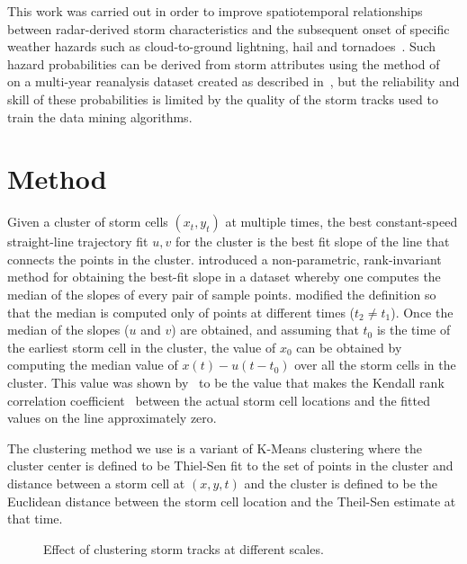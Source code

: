 \documentclass[11pt,twocolumn,twoside]{IEEEtran}
\begin{document}
This work was carried out in order to improve spatiotemporal relationships
between radar-derived storm characteristics and the subsequent onset of
specific weather hazards such as cloud-to-ground lightning, hail and
tornadoes~\cite{phi}.
Such hazard probabilities can be derived from storm attributes
using the method of~\cite{stormattr} on a multi-year reanalysis dataset created
as described in~\cite{hailclimo}, but the reliability and skill of
these probabilities is limited by the quality of the storm tracks used
to train the data mining algorithms.

\section{Method}
Given a cluster of storm cells $(x_t,y_t)$ at multiple times,
the best constant-speed straight-line trajectory fit $u,v$
for the cluster is the best fit slope of the line that connects the
points in the cluster.
\cite{theil} introduced a non-parametric, rank-invariant method for
obtaining the best-fit slope in a dataset whereby one computes
the median of the slopes of every pair of sample points.
\cite{sen} modified the definition so that the median is computed
only of points at different times ($t_2 \ne t_1$).
Once the median of the slopes ($u$ and $v$) are obtained, and
assuming that $t_0$ is the time of the earliest storm cell in the cluster,
the value of $x_0$ can be obtained by computing the median value of
$x(t) - u(t-t_0)$ over all the storm cells in the cluster.
This value was shown by~\cite{sen} to be the value that makes the
Kendall rank correlation coefficient~\cite{kendalltau} between
the actual storm cell locations and the fitted values on the line
approximately zero.

The clustering method we use is a variant of K-Means clustering where
the cluster center is defined to be Thiel-Sen fit to the set of points
in the cluster and distance between a storm cell at $(x,y,t)$
and the cluster is
defined to be the Euclidean distance between the storm cell location and the
Theil-Sen estimate at that time.

\begin{figure}
\begin{center}
\hsize {} 
\end{center}
\caption{Effect of clustering storm tracks at different scales.}
\label{trackstats.fig}
\end{figure}
\end{document}
